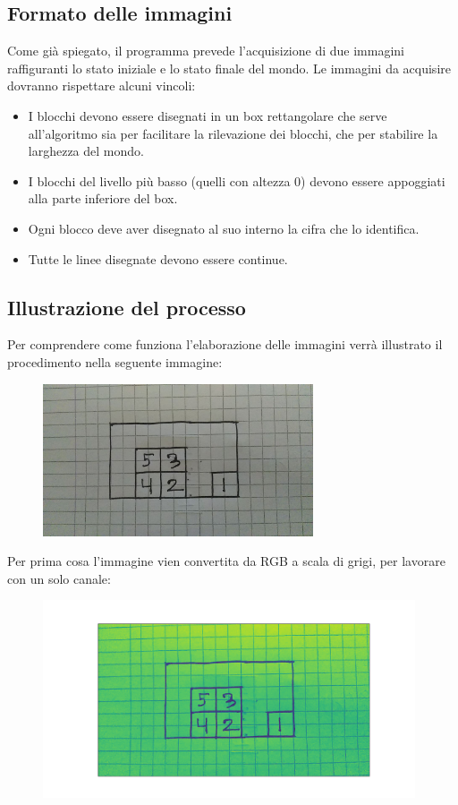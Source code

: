\documentclass{article}
\begin{document}
	\subsection{Formato delle immagini}
	Come già spiegato, il programma prevede l'acquisizione di due immagini raffiguranti lo stato iniziale e lo stato finale del mondo. Le immagini da acquisire dovranno rispettare alcuni vincoli:
	\begin{itemize}
		\item I blocchi devono essere disegnati in un box rettangolare che serve all'algoritmo sia per facilitare la rilevazione dei blocchi, che per stabilire la larghezza del mondo.
		\item I blocchi del livello più basso (quelli con altezza 0) devono essere appoggiati alla parte inferiore del box.
		\item Ogni blocco deve aver disegnato al suo interno la cifra che lo identifica.
		\item Tutte le linee disegnate devono essere continue.
	\end{itemize}
	
	\subsection{Illustrazione del processo}

	Per comprendere come funziona l'elaborazione delle immagini verrà illustrato il procedimento nella seguente immagine:\\
	
	\begin{figure}[H]
		\centering
		\includegraphics[width=8cm]{./images/immagine_test.jpg}
	\end{figure}


	\noindent Per prima cosa l'immagine vien convertita da RGB a scala di grigi, per lavorare con un solo canale:
	
	\begin{figure}[H]
		\centering
		\includegraphics[width=11cm]{./images/immagine_test_gray.png}
	\end{figure}
	
\end{document}
